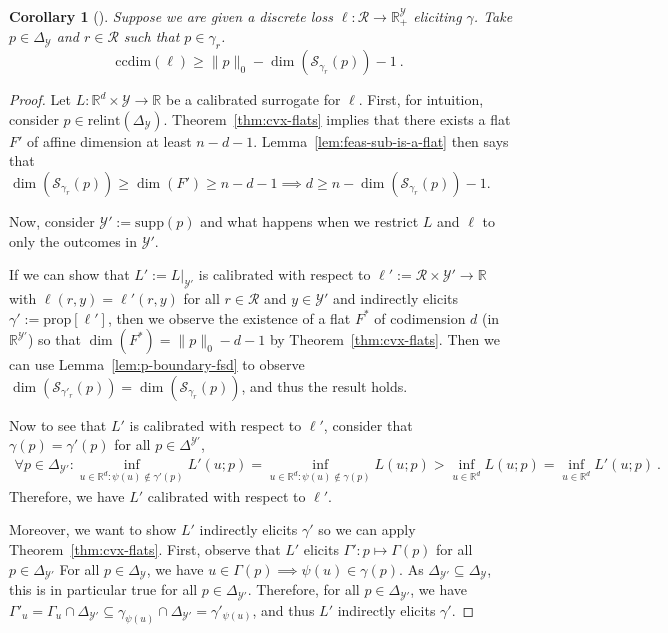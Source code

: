 \documentclass{article}
\newcommand{\reals}{\mathbb{R}}
\newcommand{\simplex}{\Delta_\Y}
\newcommand{\relint}[1]{\mathrm{relint}(#1)}
\newcommand{\prop}[1]{\mathrm{prop}[#1]}
\newcommand{\ccdim}{\mathrm{ccdim}}
\newcommand{\supp}{\mathrm{supp}}
\newcommand{\R}{\mathcal{R}}
\renewcommand{\S}{\mathcal{S}}
\newcommand{\Y}{\mathcal{Y}}
\newtheorem{corollary}{Corollary}
\begin{document}
\begin{corollary}[\cite{ramaswamy2016convex}]
	Suppose we are given a discrete loss $\ell:\R \to \reals^\Y_+$ eliciting $\gamma$.
	Take $p \in \simplex$ and $r \in \R$ such that $p \in \gamma_r$.
	\begin{equation}
	\ccdim(\ell) \geq \|p\|_0 - \dim(\S_{\gamma_r}(p)) - 1~.~
	\end{equation}
\end{corollary}
\begin{proof}
	Let $L : \reals^d \times \Y \to \reals$ be a calibrated surrogate for $\ell$.
	First, for intuition, consider $p \in \relint{\simplex}$. 
	Theorem~\ref{thm:cvx-flats} implies that there exists a flat $F'$ of affine dimension at least $n-d-1$.
	Lemma~\ref{lem:feas-sub-is-a-flat} then says that $\dim(\S_{\gamma_r}(p)) \geq \dim(F') \geq n-d-1 \implies d \geq n - \dim(\S_{\gamma_r}(p)) - 1$.
	
	Now, consider $\Y' := \supp(p)$ and what happens when we restrict $L$ and $\ell$ to only the outcomes in $\Y'$.
	
	If we can show that $L' := L|_{\Y'}$ is calibrated with respect to $\ell' := \R \times \Y' \to \reals$ with $\ell(r,y) = \ell'(r,y)$ for all $r \in \R$ and $y \in \Y'$ and indirectly elicits $\gamma' := \prop{\ell'}$, then we observe the existence of a flat $F^*$ of codimension $d$ (in $\reals^{\Y'}$) so that $\dim(F^*) = \|p\|_0 - d - 1$ by Theorem~\ref{thm:cvx-flats}.
	Then we can use Lemma~\ref{lem:p-boundary-fsd} to observe $\dim(\S_{\gamma'_r}(p)) = \dim(\S_{\gamma_r}(p))$, and thus the result holds.
	
	Now to see that $L'$ is calibrated with respect to $\ell'$, consider that $\gamma(p) = \gamma'(p)$ for all $p \in \Delta^{\Y'}$,
	\begin{align*}
		\forall p \in \Delta_{\Y'}:  \inf_{u \in \reals^d : \psi(u) \not \in \gamma'(p)} L'(u;p) = \inf_{u \in \reals^d : \psi(u) \not \in \gamma(p)} L(u;p) > \inf_{u \in \reals^d} L(u;p) = \inf_{u \in \reals^d} L'(u;p)~.~
	\end{align*}
	Therefore, we have $L'$ calibrated with respect to $\ell'$.

	Moreover, we want to show $L'$ indirectly elicits $\gamma'$ so we can apply Theorem~\ref{thm:cvx-flats}.
	First, observe that $L'$ elicits $\Gamma' : p \mapsto \Gamma(p)$ for all $p \in \Delta_{\Y'}$ 
	For all $p \in \simplex$, we have $u \in \Gamma(p) \implies \psi(u) \in \gamma(p)$.
	As $\Delta_{\Y'} \subseteq \simplex$, this is in particular true for all $p \in \Delta_{\Y'}$.
	Therefore, for all $p \in \Delta_{\Y'}$, we have $\Gamma'_u = \Gamma_u \cap \Delta_{\Y'} \subseteq \gamma_{\psi(u)} \cap \Delta_{\Y'} = \gamma'_{\psi(u)}$, and thus $L'$ indirectly elicits $\gamma'$.

\end{proof}
\end{document}
